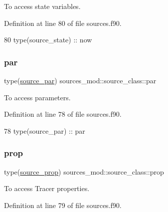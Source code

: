 To access state variables. 



Definition at line 80 of file sources.\+f90.


\begin{DoxyCode}
80         \textcolor{keywordtype}{type}(source\_state) :: now
\end{DoxyCode}
\mbox{\label{structsources__mod_1_1source__class_a7dcca40df4b520fa207dbe93d7e49b2e}} 
\subsubsection{\texorpdfstring{par}{par}}
{\footnotesize\ttfamily type(\mbox{\hyperlink{structsources__mod_1_1source__par}{source\+\_\+par}}) sources\+\_\+mod\+::source\+\_\+class\+::par\hspace{0.3cm}{\ttfamily [private]}}



To access parameters. 



Definition at line 78 of file sources.\+f90.


\begin{DoxyCode}
78         \textcolor{keywordtype}{type}(source\_par)   :: par
\end{DoxyCode}
\mbox{\label{structsources__mod_1_1source__class_a5acc9ceca409e3c1ef2ed8112325a845}} 
\subsubsection{\texorpdfstring{prop}{prop}}
{\footnotesize\ttfamily type(\mbox{\hyperlink{structsources__mod_1_1source__prop}{source\+\_\+prop}}) sources\+\_\+mod\+::source\+\_\+class\+::prop\hspace{0.3cm}{\ttfamily [private]}}



To access Tracer properties. 



Definition at line 79 of file sources.\+f90.


